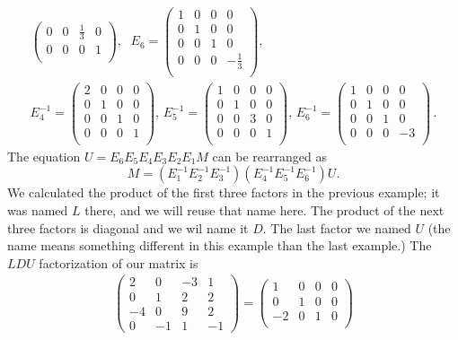 \begin{example}
\begin{align*}
\begin{pmatrix}
0&0&\frac13&0\\
0&0&0&1\\
\end{pmatrix} , \, ~~
E_6=
\begin{pmatrix}
1&0&0&0\\
0&1&0&0\\
0&0&1&0\\
0&0&0&-\frac13\\
\end{pmatrix} , \, 
\\[3mm]
E_4^{-1}=
\begin{pmatrix}
2&0&0&0\\
0&1&0&0\\
0&0&1&0\\
0&0&0&1\\
\end{pmatrix} , \, 
E_5^{-1}=
\begin{pmatrix}
1&0&0&0\\
0&1&0&0\\
0&0&3&0\\
0&0&0&1\\
\end{pmatrix} , \, 
E_6^{-1}=
\begin{pmatrix}
1&0&0&0\\
0&1&0&0\\
0&0&1&0\\
0&0&0&-3\\
\end{pmatrix} \, .
\end{align*}
The equation $U=E_6E_5E_4E_3E_2E_1 M$ can be rearranged as
\[M=(E_1^{-1}E_2^{-1}E_3^{-1})(E_4^{-1}E_5^{-1}E_6^{-1})U.\] 
We calculated the product of the first three factors in the previous example; it was named $L$ there, and we will reuse that name here. The product of the next three factors is diagonal and we wil name it $D$. The last factor we named $U$ (the name means something different in this example than the last example.) The $LDU$ factorization of our matrix is
\begin{align*}
\begin{pmatrix}
2&0&-3&1\\
0&1&2&2\\
-4&0&9&2\\
0&-1&1&-1
\end{pmatrix}
=
\begin{pmatrix}
1&0&0&0\\
0&1&0&0\\
-2&0&1&0\\

\end{pmatrix}
\end{align*}
\end{example}
